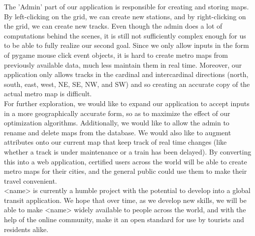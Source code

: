 \documentclass[fontsize=11pt]{article}
\begin{document}
The 'Admin' part of our application is responsible for creating and storing maps. By left-clicking on the grid, we can create new stations, and by right-clicking on the grid, we can create new tracks. Even though the admin does a lot of computations behind the scenes, it is still not sufficiently complex enough for us to be able to fully realize our second goal. Since we only allow inputs in the form of pygame mouse click event objects, it is hard to create metro maps from previously available data, much less maintain them in real time. Moreover, our application only allows tracks in the cardinal and intercardinal directions (north, south, east, west, NE, SE, NW, and SW) and so creating an accurate copy of the actual metro map is difficult. \\

For further exploration, we would like to expand our application to accept inputs in a more geographically accurate form, so as to maximize the effect of our optimization algorithms. Additionally, we would like to allow the admin to rename and delete maps from the database. We would also like to augment attributes onto our current map that keep track of real time changes (like whether a track is under maintenance or a train has been delayed). By converting this into a web application, certified users across the world will be able to create metro maps for their cities, and the general public could use them to make their travel convenient. \\

<name> is currently a humble project with the potential to develop into a global transit application. We hope that over time, as we develop new skills, we will be able to make <name> widely available to people across the world, and with the help of the online community, make it an open standard for use by tourists and residents alike.
\end{document}
